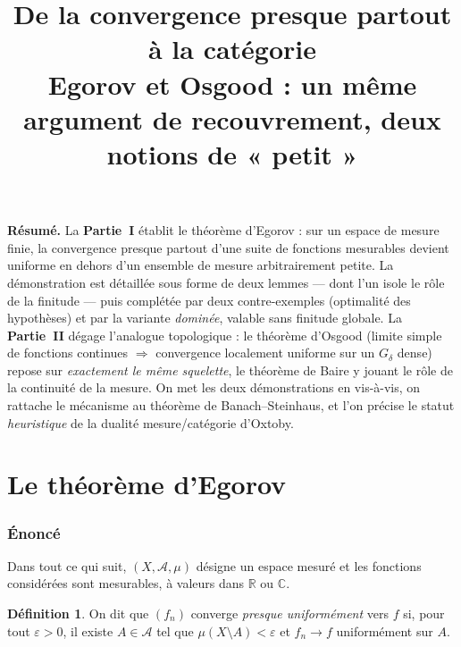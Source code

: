 \documentclass[11pt,a4paper]{article}
\title{\bfseries De la convergence presque partout à la catégorie\\[0.35em]
\large Egorov et Osgood : un même argument de recouvrement, deux notions de « petit »}
\author{}
\date{}
\theoremstyle{plain}
\theoremstyle{definition}
\newtheorem{definition}{Définition}
\newcommand{\R}{\mathbb{R}}
\newcommand{\A}{\mathcal{A}}
\newcommand{\1}{\mathbf{1}}
\begin{document}
\maketitle
\vspace{-2.0em}

\begin{center}
\begin{minipage}{0.9\textwidth}\small
\noindent\textbf{Résumé.} La \textbf{Partie~I} établit le théorème d'Egorov : sur
un espace de mesure finie, la convergence presque partout d'une suite de fonctions
mesurables devient uniforme en dehors d'un ensemble de mesure arbitrairement
petite. La démonstration est détaillée sous forme de deux lemmes — dont l'un isole
le rôle de la finitude — puis complétée par deux contre-exemples (optimalité des
hypothèses) et par la variante \emph{dominée}, valable sans finitude globale. La
\textbf{Partie~II} dégage l'analogue topologique : le théorème d'Osgood (limite
simple de fonctions continues $\Rightarrow$ convergence localement uniforme sur un
$G_\delta$ dense) repose sur \emph{exactement le même squelette}, le théorème de
Baire y jouant le rôle de la continuité de la mesure. On met les deux
démonstrations en vis-à-vis, on rattache le mécanisme au théorème de
Banach--Steinhaus, et l'on précise le statut \emph{heuristique} de la dualité
mesure/catégorie d'Oxtoby.
\end{minipage}
\end{center}
\vspace{0.4em}

{\small\tableofcontents}
\bigskip

\part{Le théorème d'Egorov}

\section{Énoncé}

Dans tout ce qui suit, $(X,\A,\mu)$ désigne un espace mesuré et les fonctions
considérées sont mesurables, à valeurs dans $\R$ ou $\mathbb{C}$.

\begin{definition}
On dit que $(f_n)$ converge \emph{presque uniformément} vers $f$ si, pour tout
$\varepsilon>0$, il existe $A\in\A$ tel que $\mu(X\setminus A)<\varepsilon$ et
$f_n\to f$ uniformément sur $A$.
\end{definition}
\end{document}
